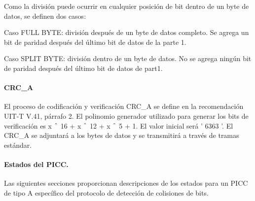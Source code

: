 Como la división puede ocurrir en cualquier posición de bit dentro de un byte de datos, se definen dos casos:\par

Caso FULL BYTE: división después de un byte de datos completo. Se agrega un bit de paridad después del último bit de datos de la parte 1.\par

Caso SPLIT BYTE: división dentro de un byte de datos. No se agrega ningún bit de paridad después del último bit de datos de part1.\par

\paragraph{CRC\_A}
El proceso de codificación y verificación CRC\_A se define en la recomendación UIT-T V.41, párrafo 2. El polinomio generador utilizado para generar los bits de verificación es x $ \string^ $  16 + x $ \string^ $  12 + x $ \string^ $  5 + 1. El valor inicial será ' 6363 '. El CRC\_A se adjuntará a los bytes de datos y se transmitirá a través de tramas estándar.\par

\paragraph{Estados del PICC.}
Las siguientes secciones proporcionan descripciones de los estados para un PICC de tipo A específico del protocolo de detección de colisiones de bits.\par




